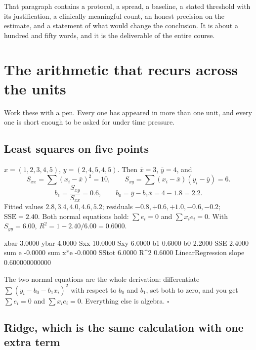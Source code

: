 \documentclass[11pt]{article}
\begin{document}
That paragraph contains a protocol, a spread, a baseline, a stated threshold
with its justification, a clinically meaningful count, an honest precision on
the estimate, and a statement of what would change the conclusion. It is
about a hundred and fifty words, and it is the deliverable of the entire
course.

\section{The arithmetic that recurs across the units}
\label{sec:hand}

Work these with a pen. Every one has appeared in more than one unit, and
every one is short enough to be asked for under time pressure.

\subsection{Least squares on five points}

\begin{worked}
$x = (1,2,3,4,5)$, $y = (2,4,5,4,5)$. Then $\bar x = 3$, $\bar y = 4$, and
\[
  S_{xx} = \sum (x_i - \bar x)^2 = 10, \qquad
  S_{xy} = \sum (x_i - \bar x)(y_i - \bar y) = 6 .
\]
\[
  b_1 = \frac{S_{xy}}{S_{xx}} = 0.6, \qquad
  b_0 = \bar y - b_1 \bar x = 4 - 1.8 = 2.2 .
\]
Fitted values $2.8, 3.4, 4.0, 4.6, 5.2$; residuals
$-0.8, +0.6, +1.0, -0.6, -0.2$; $\mathrm{SSE} = 2.40$. Both normal equations
hold: $\sum e_i = 0$ and $\sum x_i e_i = 0$. With
$S_{yy} = 6.00$, $R^2 = 1 - 2.40/6.00 = 0.6000$.
\end{worked}

\begin{codeout}
xbar 3.0000  ybar 4.0000  Sxx 10.0000  Sxy 6.0000
b1 0.6000   b0 2.2000   SSE 2.4000
sum e -0.0000   sum x*e -0.0000   SStot 6.0000   R^2 0.6000
LinearRegression slope 0.600000000000
\end{codeout}

The two normal equations are the whole derivation: differentiate
$\sum (y_i - b_0 - b_1 x_i)^2$ with respect to $b_0$ and $b_1$, set both to
zero, and you get $\sum e_i = 0$ and $\sum x_i e_i = 0$. Everything else is
algebra. \ensuremath{\square}

\subsection{Ridge, which is the same calculation with one extra term}
\end{document}
